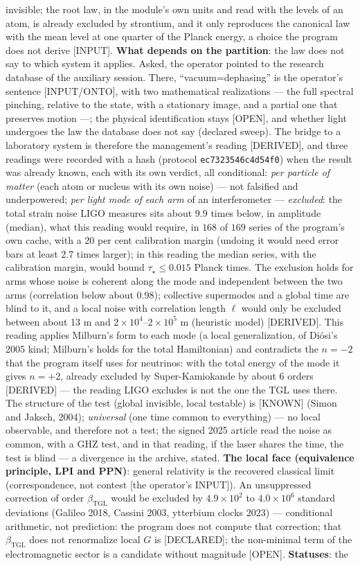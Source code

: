 \documentclass[11pt]{article}
\newcommand{\bTGL}{\beta_{\mathrm{TGL}}}\newcommand{\Msun}{M_{\odot}}\newcommand{\TGL}{\mathrm{TGL}}
\theoremstyle{definition}\newtheorem{deriv}{Derivation}
\begin{document}
invisible; the root law, in the module's own units and read with the levels of an atom, is already excluded by strontium, and it only reproduces the canonical law with the mean level at one quarter of the Planck energy, a choice the program does not derive [INPUT]. \textbf{What depends on the partition}: the law does not say to which system it applies. Asked, the operator pointed to the research database of the auxiliary session. There, ``vacuum=dephasing'' is the operator's sentence [INPUT/ONTO], with two mathematical realizations --- the full spectral pinching, relative to the state, with a stationary image, and a partial one that preserves motion ---; the physical identification stays [OPEN], and whether light undergoes the law the database does not say (declared sweep). The bridge to a laboratory system is therefore the management's reading [DERIVED], and three readings were recorded with a hash (protocol \texttt{ec7323546c4d54f0}) when the result was already known, each with its own verdict, all conditional: \emph{per particle of matter} (each atom or nucleus with its own noise) --- not falsified and underpowered; \emph{per light mode of each arm} of an interferometer --- \emph{excluded}: the total strain noise LIGO measures sits about $9.9$ times below, in amplitude (median), what this reading would require, in $168$ of $169$ series of the program's own cache, with a $20$ per cent calibration margin (undoing it would need error bars at least $2.7$ times larger); in this reading the median series, with the calibration margin, would bound $\tau_\star\le 0.015$ Planck times. The exclusion holds for arms whose noise is coherent along the mode and independent between the two arms (correlation below about 0.98); collective supermodes and a global time are blind to it, and a local noise with correlation length $\ell$ would only be excluded between about 13 m and $2\times10^{4}$--$2\times10^{5}$ m (heuristic model) [DERIVED]. This reading applies Milburn's form to each mode (a local generalization, of Diósi's 2005 kind; Milburn's holds for the total Hamiltonian) and contradicts the $n=-2$ that the program itself uses for neutrinos: with the total energy of the mode it gives $n=+2$, already excluded by Super-Kamiokande by about 6 orders [DERIVED] --- the reading LIGO excludes is not the one the TGL uses there. The structure of the test (global invisible, local testable) is [KNOWN] (Simon and Jaksch, 2004); \emph{universal} (one time common to everything) --- no local observable, and therefore not a test; the signed 2025 article read the noise as common, with a GHZ test, and in that reading, if the laser shares the time, the test is blind --- a divergence in the archive, stated. \textbf{The local face (equivalence principle, LPI and PPN)}: general relativity is the recovered classical limit (correspondence, not contest [the operator's INPUT]). An unsuppressed correction of order $\bTGL$ would be excluded by $4.9\times10^{2}$ to $4.0\times10^{6}$ standard deviations (Galileo 2018, Cassini 2003, ytterbium clocks 2023) --- conditional arithmetic, not prediction: the program does not compute that correction; that $\bTGL$ does not renormalize local $G$ is [DECLARED]; the non-minimal term of the electromagnetic sector is a candidate without magnitude [OPEN]. \textbf{Statuses}: the 
\end{document}
